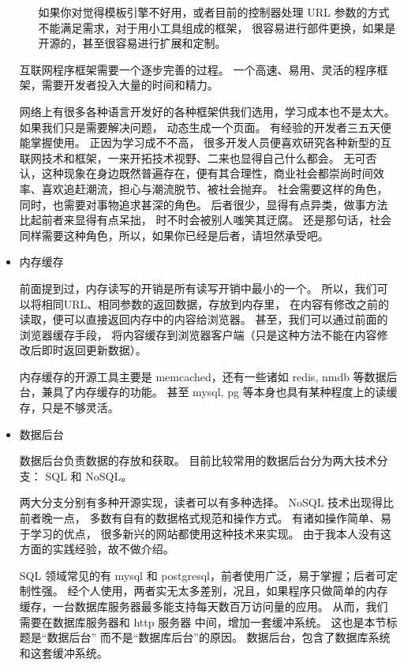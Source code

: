 \documentclass{article}
\begin{document}
\begin{itemize}
\begin{itemize}
      如果你对觉得模板引擎不好用，或者目前的控制器处理 URL 参数的方式不能满足需求，对于用小工具组成的框架，
      很容易进行部件更换，如果是开源的，甚至很容易进行扩展和定制。
    \end{itemize}

    互联网程序框架需要一个逐步完善的过程。 一个高速、易用、灵活的程序框架，需要开发者投入大量的时间和精力。

    网络上有很多各种语言开发好的各种框架供我们选用，学习成本也不是太大。 如果我们只是需要解决问题，
    动态生成一个页面。 有经验的开发者三五天便能掌握使用。 正因为学习成不不高，
    很多开发人员便喜欢研究各种新型的互联网技术和框架，一来开拓技术视野、二来也显得自己什么都会。
    无可否认，这种现象在身边既然普遍存在，便有其合理性，商业社会都崇尚时间效率、喜欢追赶潮流，担心与潮流脱节、被社会抛弃。
    社会需要这样的角色，同时，也需要对事物追求甚深的角色。 后者很少，显得有点异类，做事方法比起前者来显得有点呆拙，
    时不时会被别人嗤笑其迂腐。 还是那句话，社会同样需要这种角色，所以，如果你已经是后者，请坦然承受吧。

  \item 内存缓存

    前面提到过，内存读写的开销是所有读写开销中最小的一个。 所以，我们可以将相同URL、相同参数的返回数据，存放到内存里，
    在内容有修改之前的读取，便可以直接返回内存中的内容给浏览器。 甚至，我们可以通过前面的浏览器缓存手段，
    将内容缓存到浏览器客户端（只是这种方法不能在内容修改后即时返回更新数据）。

    内存缓存的开源工具主要是 memcached，还有一些诸如 redis, nmdb 等数据后台，兼具了内存缓存的功能。
    甚至 mysql, pg 等本身也具有某种程度上的读缓存，只是不够灵活。
    
  \item 数据后台

    数据后台负责数据的存放和获取。 目前比较常用的数据后台分为两大技术分支： SQL 和 NoSQL。

    两大分支分别有多种开源实现，读者可以有多种选择。 NoSQL 技术出现得比前者晚一点，
    多数有自有的数据格式规范和操作方式。 有诸如操作简单、易于学习的优点，
    很多新兴的网站都使用这种技术来实现。 由于我本人没有这方面的实践经验，故不做介绍。

    SQL 领域常见的有 mysql 和 postgresql，前者使用广泛，易于掌握；后者可定制性强。
    经个人使用，两者实无太多差别，况且，如果程序只做简单的内存缓存，一台数据库服务器最多能支持每天数百万访问量的应用。
    从而，我们需要在数据库服务器和 http 服务器 中间，增加一套缓冲系统。
    这也是本节标题是“数据后台” 而不是“数据库后台”的原因。 数据后台，包含了数据库系统和这套缓冲系统。


\end{itemize}
\end{document}
